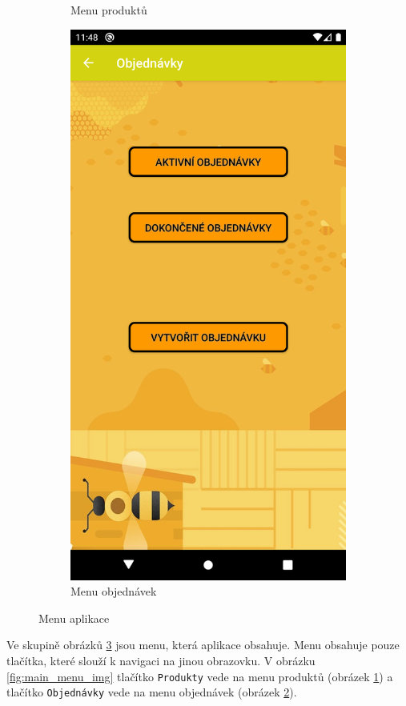 \documentclass[12pt]{report}
\begin{document}
\begin{figure}[H]
\begin{subfigure}{.3\textwidth}
	  \caption{Menu produktů}
	  \label{fig:product_menu_img}
	\end{subfigure}
	\begin{subfigure}{.3\textwidth}
	  \centering
	  \includegraphics[width=\textwidth]{img/order_menu.png}
	  \caption{Menu objednávek}
	  \label{fig:order_menu_img}
	\end{subfigure}
	\caption{Menu aplikace}
	\label{fig:menus_cont}
\end{figure}
%
Ve skupině obrázků \ref{fig:menus_cont} jsou menu, která aplikace obsahuje. Menu obsahuje pouze tlačítka,
které slouží k navigaci na jinou obrazovku. V obrázku \ref{fig:main_menu_img} tlačítko \texttt{Produkty}
vede na menu produktů (obrázek \ref{fig:product_menu_img}) a tlačítko \texttt{Objednávky} vede na menu 
objednávek (obrázek \ref{fig:order_menu_img}).
%
\end{document}
